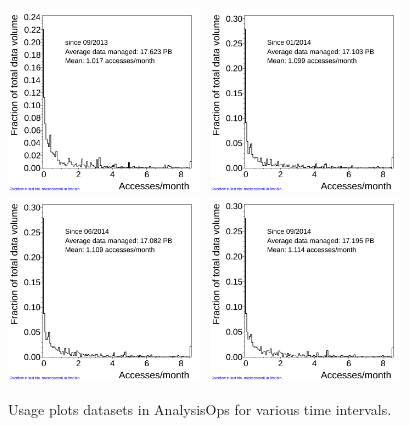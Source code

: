 \begin{figure}[h!]
  \centering
  \includegraphics[width=0.45\textwidth]{plots/analysisOps_usage.png}~ 
  \includegraphics[width=0.45\textwidth]{plots/DatasetSummary01-2014_nSitesAverage.png}\\
  \includegraphics[width=0.45\textwidth]{plots/DatasetSummary06-2014_nSitesAverage.png}~
  \includegraphics[width=0.45\textwidth]{plots/DatasetSummary09-2014_nSitesAverage.png}
  \caption{Usage plots datasets in AnalysisOps for various time intervals.}
  \label{fig:usage}
\end{figure}

\clearpage

